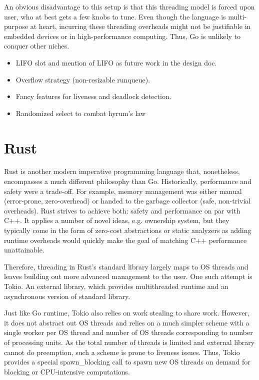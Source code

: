 \documentclass[12pt,a4paper,twoside]{report}
\begin{document}
An obvious disadvantage to this setup is that this threading model is forced upon user, who at best gets a few knobs to tune. Even though the language is multi-purpose at heart, incurring these threading overheads might not be justifiable in embedded devices or in high-performance computing. Thus, Go is unlikely to conquer other niches. 



\begin{itemize}
    \item LIFO slot and mention of LIFO as future work in the design doc.
    \item Overflow strategy (non-resizable runqueue).
    \item Fancy features for liveness and deadlock detection.
    \item Randomized select to combat hyrum's law
\end{itemize}


\section{Rust}
\label{section:rel-work-rust}
Rust is another modern imperative programming language that, nonetheless, encompasses a much different philosophy than Go. Historically, performance and safety were a trade-off. For example, memory management was either manual (error-prone, zero-overhead) or handed to the garbage collector (safe, non-trivial overheads). Rust strives to achieve both: safety and performance on par with C++. It applies a number of novel ideas, e.g. ownership system, but they typically come in the form of zero-cost abstractions or static analyzers as adding runtime overheads would quickly make the goal of matching C++ performance unattainable. 

Therefore, threading in Rust's standard library largely maps to OS threads and leaves building out more advanced management to the user. One such attempt is Tokio. An external library, which provides multithreaded runtime and an asynchronous version of standard library.

Just like Go runtime, Tokio also relies on work stealing to share work. However, it does not abstract out OS threads and relies on a much simpler scheme with a single worker per OS thread and number of OS threads corresponding to number of processing units. As the total number of threads is limited and external library cannot do preemption, such a scheme is prone to liveness issues. Thus, Tokio provides a special spawn\_blocking call to spawn new OS threads on demand for blocking or CPU-intensive computations. 
\end{document}
